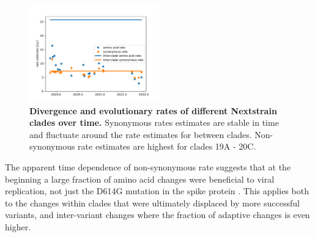 \documentclass[aps,rmp, twocolumn]{revtex4}
\begin{document}
\begin{figure}
    \includegraphics[width=0.5\textwidth]{figures/rate_progression.pdf}
    \caption{{\bf Divergence and evolutionary rates of different Nextstrain clades over time.} Synonymous rates estimates are stable in time and fluctuate around the rate estimates for between clades. Non-synonymous rate estimates are highest for clades 19A - 20C.
    \label{fig:rate_progression} }
\end{figure}

The apparent time dependence of non-synonymous rate suggests that at the beginning a large fraction of amino acid changes were beneficial to viral replication, not just the D614G mutation in the spike protein \citep{korber_tracking_2020}.
This applies both to the changes within clades that were ultimately displaced by more successful variants, and inter-variant changes where the fraction of adaptive changes is even higher.
\end{document}
